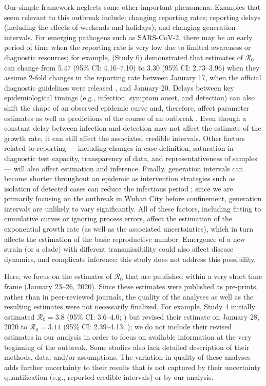 \documentclass[12pt]{article}
\newcommand{\Ro}{\ensuremath{{\mathcal R}_{0}}\xspace}
\begin{document}
Our simple framework neglects some other important phenomena.
Examples that seem relevant to this outbreak include: changing reporting rates; reporting delays (including the effects of weekends and holidays); and changing generation intervals.
For emerging pathogens such as SARS-CoV-2, there may be an early period of time when the reporting rate is very low due to limited awareness or diagnostic resources;
for example, \cite{zhaoncov} (Study 6) demonstrated that estimates of \Ro can change from 5.47 (95\% CI: 4.16--7.10) to 3.30 (95\% CI: 2.73--3.96) when they assume 2-fold changes in the reporting rate between January 17, when the official diagnostic guidelines were released \citep{who17protocol}, and January 20.
Delays between key epidemiological timings (e.g., infection, symptom onset, and detection) can also shift the shape of an observed epidemic curve and, therefore, affect parameter estimates as well as predictions of the course of an outbreak \citep{tariq2019assessing}.
Even though a constant delay between infection and detection may not affect the estimate of the growth rate, it can still affect the associated credible intervals.
Other factors related to reporting --- including changes in case definition, saturation in diagnostic test capacity, transparency of data, and representativeness of samples --- will also affect estimation and inference.
Finally, generation intervals can become shorter throughout an epidemic as intervention strategies such as isolation of detected cases can reduce the infectious period \citep{hethcote2002effects};
since we are primarily focusing on the outbreak in Wuhan City before confinement, generation intervals are unlikely to vary significantly.
All of these factors, including fitting to cumulative curves or ignoring process errors, affect the estimation of the exponential growth rate (as well as the associated uncertainties), which in turn affects the estimation of the basic reproductive number.
Emergence of a new strain (or a clade) with different transmissibility could also affect disease dynamics, and complicate inference; this study does not address this possibility.

Here, we focus on the estimates of \Ro that are published within a very short time frame (January 23--26, 2020).
Since these estimates were published as pre-prints, rather than in peer-reviewed journals, the quality of the analyses as well as the resulting estimates were not necessarily finalized.
For example, Study 4 initially estimated $\Ro = 3.8$ (95\% CI: 3.6--4.0; \cite{readncov}) but revised their estimate on January 28, 2020 to $\Ro = 3.11$ (95\% CI: 2.39--4.13; \cite{readncov2});
we do not include their revised estimates in our analysis in order to focus on available information at the very beginning of the outbreak.
Some studies also lack detailed description of their methods, data, and/or assumptions.
The variation in quality of these analyses adds further uncertainty to their results that is not captured by their uncertainty quantification (e.g., reported credible intervals) or by our analysis.
\end{document}

